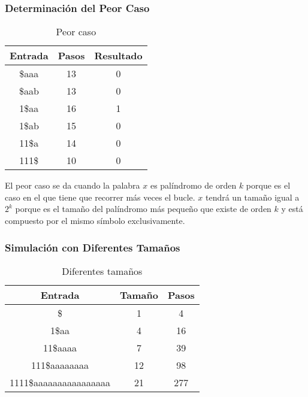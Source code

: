 \documentclass{uc3mpracticas}
\begin{document}
  \subsubsection{Determinación del Peor Caso}

  \begin{table}[!h]
    \centering
  \begin{tabular}{|c|c|c|}
  \hline
  \textbf{Entrada} & \textbf{Pasos} & \textbf{Resultado} \\ \hline
  \$aaa   & 13             & 0                  \\ \hline
    \$aab   & 13             & 0                  \\ \hline
  1\$aa   & 16             & 1                  \\ \hline
  1\$ab            & 15             & 0                  \\ \hline
  11\$a            & 14             & 0                  \\ \hline
  111\$            & 10             & 0                  \\ \hline
  \end{tabular}
  \caption{Peor caso}
  \end{table}

  El peor caso se da cuando la palabra $x$ es palíndromo de orden $k$ porque es el caso en el que tiene que recorrer más veces el bucle. $x$ tendrá un tamaño igual a $2^k$ porque es el tamaño del palíndromo más pequeño que existe de orden $k$ y está compuesto por el mismo símbolo exclusivamente.


  \subsubsection{Simulación con Diferentes Tamaños}

  \begin{table}[!h]
    \centering
  \begin{tabular}{|c|c|c|}
  \hline
  \textbf{Entrada}       & \textbf{Tamaño} & \textbf{Pasos} \\ \hline
  \$            & 1               & 4              \\ \hline
  1\$aa         & 4               & 16             \\ \hline
  11\$aaaa      & 7               & 39             \\ \hline
  111\$aaaaaaaa          & 12              & 98             \\ \hline
  1111\$aaaaaaaaaaaaaaaa & 21              & 277            \\ \hline
  \end{tabular}
  \caption{Diferentes tamaños}
  \end{table}
\end{document}
